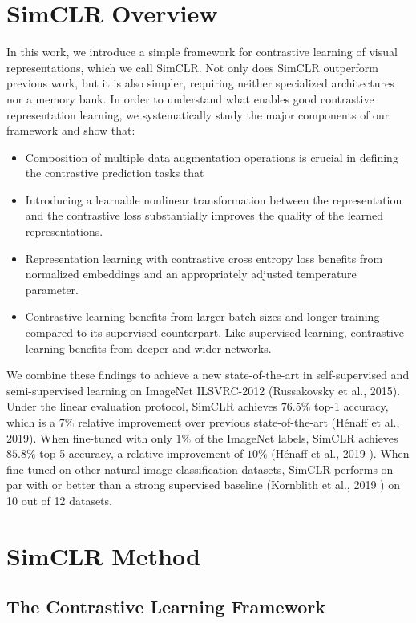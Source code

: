 \documentclass[]{IEEEtran}
\begin{document}
\section{SimCLR Overview}
In this work, we introduce a simple framework for contrastive learning of visual representations, which we call SimCLR. Not only does SimCLR outperform previous work, but it is also simpler, requiring neither specialized architectures nor a memory bank. In order to understand what enables good contrastive representation learning, we systematically study the major components of our framework and show that: 
\begin{itemize}
    \item Composition of multiple data augmentation operations is crucial in defining the contrastive prediction tasks that 
    \item Introducing a learnable nonlinear transformation between the representation and the contrastive loss substantially improves the quality of the learned representations.
    \item Representation learning with contrastive cross entropy loss benefits from normalized embeddings and an appropriately adjusted temperature parameter.
    \item Contrastive learning benefits from larger batch sizes and longer training compared to its supervised counterpart. Like supervised learning, contrastive learning benefits from deeper and wider networks.
\end{itemize}

We combine these findings to achieve a new state-of-the-art in self-supervised and semi-supervised learning on ImageNet ILSVRC-2012 (Russakovsky et al., 2015). Under the linear evaluation protocol, SimCLR achieves $76.5 \%$ top-1 accuracy, which is a $7 \%$ relative improvement over previous state-of-the-art (Hénaff et al., 2019). When fine-tuned with only $1 \%$ of the ImageNet labels, SimCLR achieves $85.8 \%$ top-5 accuracy, a relative improvement of $10 \%$ (Hénaff et al., 2019 ). When fine-tuned on other natural image classification datasets, SimCLR performs on par with or better than a strong supervised baseline (Kornblith et al., 2019 ) on 10 out of 12 datasets.


\section{SimCLR Method}
\subsection{The Contrastive Learning Framework}
\end{document}
